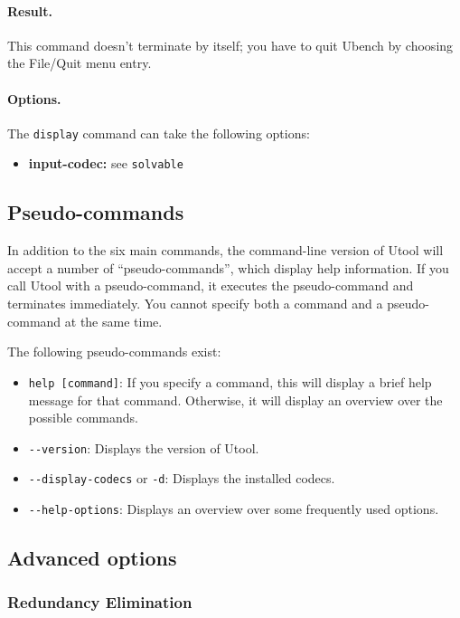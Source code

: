 \paragraph{Result.} This command doesn't terminate by itself; you have
to quit Ubench by choosing the File/Quit menu entry.

\paragraph{Options.} The \verb?display? command can take the following
options:

\begin{itemize}
\item \textbf{input-codec:} see \verb?solvable? 
\end{itemize}




\subsection{Pseudo-commands}

In addition to the six main commands, the command-line version of
Utool will accept a number of ``pseudo-commands'', which display help
information. If you call Utool with a pseudo-command, it executes the
pseudo-command and terminates immediately. You cannot specify both a
command and a pseudo-command at the same time.

The following pseudo-commands exist:

\begin{itemize}
\item \verb?help [command]?: If you specify a command, this will
display a brief help message for that command. Otherwise, it will
display an overview over the possible commands.
\item \verb?--version?: Displays the version of Utool.
\item \verb?--display-codecs? or \verb?-d?: Displays the installed
codecs.
\item \verb?--help-options?: Displays an overview over some frequently
used options.
\end{itemize}




\subsection{Advanced options}

\subsubsection{Redundancy Elimination} \label{sec:redund-elim}

